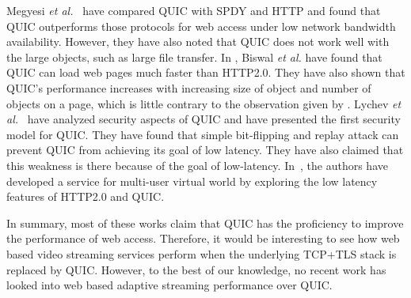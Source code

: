 Megyesi \textit{et al.}~\cite{quicisquic} have compared QUIC with SPDY and HTTP and found that QUIC outperforms those protocols for web access under low network bandwidth availability. However, they have also noted that QUIC does not work well with the large objects, such as large file transfer. In \cite{biswal2016}, Biswal \textit{et al.} have found that QUIC can load web pages much faster than HTTP2.0. They have also shown that QUIC's performance increases with increasing size of object and number of objects on a page, which is little contrary to the observation given by \cite{quicisquic}. Lychev \textit{et al.}~\cite{lychev2015secure} have analyzed security aspects of QUIC and have presented the first security model for QUIC. They have found that simple bit-flipping and replay attack can prevent QUIC from achieving its goal of low latency. They have also claimed that this weakness is there because of the goal of low-latency. In~\cite{bakri2015http}, the authors have developed a service for multi-user virtual world by exploring the low latency features of HTTP2.0 and QUIC. 

In summary, most of these works claim that QUIC has the proficiency to improve the performance of web access.
Therefore, it would be interesting to see how web based video streaming services perform when the underlying TCP+TLS stack is replaced by QUIC. However, to the best of our knowledge, no recent work has looked into web based adaptive streaming performance over QUIC. 


